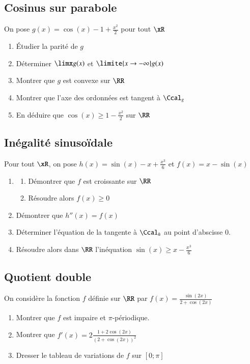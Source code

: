 \documentclass[oneside,12pt]{article}          %
\begin{document}
\subsection{Cosinus sur parabole}
On pose $g(x)=\cos(x)-1+\frac{x^2}{2}$ pour tout $\xR$
\begin{enumerate}
	\item Étudier la parité de $g$
	\item Déterminer $\limx g(x)$ et $\limite{x\to-\infty}g(x)$
	\item Montrer que $g$ est convexe sur $\RR$
	\item Montrer que l'axe des ordonnées est tangent à $\Ccal_g$
	\item En déduire que $\cos(x)\geq1-\frac{x^2}{2}$ sur $\RR$
\end{enumerate}



\subsection{Inégalité sinusoïdale}
Pour tout $\xR$, on pose $h(x)=\sin(x)-x+\frac{x^3}{6}$ et $f(x)=x-\sin(x)$
\begin{enumerate}
	\item \begin{enumerate}
		\item Démontrer que $f$ est croissante sur $\RR$
		\item Résoudre alors $f(x)\geq0$
	\end{enumerate}
	\item Démontrer que $h''(x)=f(x)$
	\item Déterminer l'équation de la tangente à $\Ccal_h$ au point d'abscisse 0.
	\item Résoudre alors dans $\RR$ l'inéquation $\sin(x)\geq x-\frac{x^3}{6}$
\end{enumerate} 



\subsection{Quotient double}
On considère la fonction $f$ définie sur $\RR$ par $f(x)=\frac{\sin(2x)}{2+\cos(2x)}$
\begin{enumerate}
	\item Montrer que $f$ est impaire et $\pi$-périodique.
	\item Montrer que $f'(x)=2\frac{1+2\cos(2x)}{(2+\cos(2x))^2}$
	\item Dresser le tableau de variations de $f$ sur $[0;\pi]$
\end{enumerate}
\end{document}
